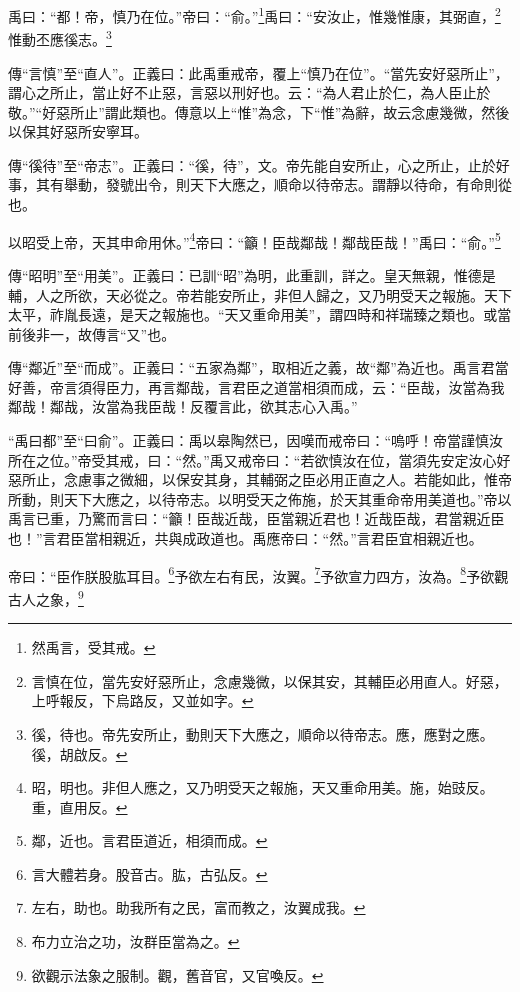 禹曰：“都！帝，慎乃在位。”帝曰：“俞。”\footnote{然禹言，受其戒。}禹曰：“安汝止，惟幾惟康，其弼直，\footnote{言慎在位，當先安好惡所止，念慮幾微，以保其安，其輔臣必用直人。好惡，上呼報反，下烏路反，又並如字。}惟動丕應徯志。\footnote{徯，待也。帝先安所止，動則天下大應之，順命以待帝志。應，應對之應。徯，胡啟反。}


{\noindent\zhuan{}\fzbyks 傳“言慎”至“直人”。正義曰：此禹重戒帝，覆上“慎乃在位”。“當先安好惡所止”，謂心之所止，當止好不止惡，言惡以刑好也。云：“為人君止於仁，為人臣止於敬。”“好惡所止”謂此類也。傳意以上“惟”為念，下“惟”為辭，故云念慮幾微，然後以保其好惡所安寧耳。 \par}

{\noindent\zhuan{}\fzbyks 傳“徯待”至“帝志”。正義曰：“徯，待”，文。帝先能自安所止，心之所止，止於好事，其有舉動，發號出令，則天下大應之，順命以待帝志。謂靜以待命，有命則從也。 \par}

以昭受上帝，天其申命用休。”\footnote{昭，明也。非但人應之，又乃明受天之報施，天又重命用美。施，始豉反。重，直用反。}帝曰：“籲！臣哉鄰哉！鄰哉臣哉！”禹曰：“俞。”\footnote{鄰，近也。言君臣道近，相須而成。}

{\noindent\zhuan{}\fzbyks 傳“昭明”至“用美”。正義曰：已訓“昭”為明，此重訓，詳之。皇天無親，惟德是輔，人之所欲，天必從之。帝若能安所止，非但人歸之，又乃明受天之報施。天下太平，祚胤長遠，是天之報施也。“天又重命用美”，謂四時和祥瑞臻之類也。或當前後非一，故傳言“又”也。 \par}

{\noindent\zhuan{}\fzbyks 傳“鄰近”至“而成”。正義曰：“五家為鄰”，取相近之義，故“鄰”為近也。禹言君當好善，帝言須得臣力，再言鄰哉，言君臣之道當相須而成，云：“臣哉，汝當為我鄰哉！鄰哉，汝當為我臣哉！反覆言此，欲其志心入禹。” \par}

{\noindent\shu{}\fzkt “禹曰都”至“曰俞”。正義曰：禹以皋陶然已，因嘆而戒帝曰：“嗚呼！帝當謹慎汝所在之位。”帝受其戒，曰：“然。”禹又戒帝曰：“若欲慎汝在位，當須先安定汝心好惡所止，念慮事之微細，以保安其身，其輔弼之臣必用正直之人。若能如此，惟帝所動，則天下大應之，以待帝志。以明受天之佈施，於天其重命帝用美道也。”帝以禹言已重，乃驚而言曰：“籲！臣哉近哉，臣當親近君也！近哉臣哉，君當親近臣也！”言君臣當相親近，共與成政道也。禹應帝曰：“然。”言君臣宜相親近也。 \par}

帝曰：“臣作朕股肱耳目。\footnote{言大體若身。股音古。肱，古弘反。}予欲左右有民，汝翼。\footnote{左右，助也。助我所有之民，富而教之，汝翼成我。}予欲宣力四方，汝為。\footnote{布力立治之功，汝群臣當為之。}予欲觀古人之象，\footnote{欲觀示法象之服制。觀，舊音官，又官喚反。}


